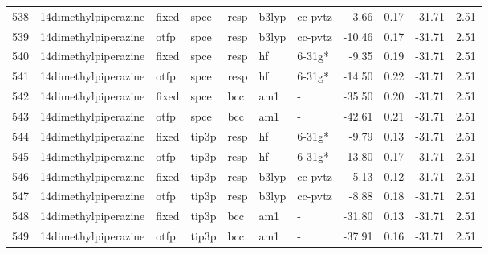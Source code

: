 \begin{tabular}{lllllllrrrr}
538 &          14dimethylpiperazine &  fixed &   spce &   resp &   b3lyp &      cc-pvtz &       -3.66 &     0.17 &      -31.71 &      2.51 \\
539 &          14dimethylpiperazine &   otfp &   spce &   resp &   b3lyp &      cc-pvtz &      -10.46 &     0.17 &      -31.71 &      2.51 \\
540 &          14dimethylpiperazine &  fixed &   spce &   resp &      hf &       6-31g* &       -9.35 &     0.19 &      -31.71 &      2.51 \\
541 &          14dimethylpiperazine &   otfp &   spce &   resp &      hf &       6-31g* &      -14.50 &     0.22 &      -31.71 &      2.51 \\
542 &          14dimethylpiperazine &  fixed &   spce &    bcc &     am1 &            - &      -35.50 &     0.20 &      -31.71 &      2.51 \\
543 &          14dimethylpiperazine &   otfp &   spce &    bcc &     am1 &            - &      -42.61 &     0.21 &      -31.71 &      2.51 \\
544 &          14dimethylpiperazine &  fixed &  tip3p &   resp &      hf &       6-31g* &       -9.79 &     0.13 &      -31.71 &      2.51 \\
545 &          14dimethylpiperazine &   otfp &  tip3p &   resp &      hf &       6-31g* &      -13.80 &     0.17 &      -31.71 &      2.51 \\
546 &          14dimethylpiperazine &  fixed &  tip3p &   resp &   b3lyp &      cc-pvtz &       -5.13 &     0.12 &      -31.71 &      2.51 \\
547 &          14dimethylpiperazine &   otfp &  tip3p &   resp &   b3lyp &      cc-pvtz &       -8.88 &     0.18 &      -31.71 &      2.51 \\
548 &          14dimethylpiperazine &  fixed &  tip3p &    bcc &     am1 &            - &      -31.80 &     0.13 &      -31.71 &      2.51 \\
549 &          14dimethylpiperazine &   otfp &  tip3p &    bcc &     am1 &            - &      -37.91 &     0.16 &      -31.71 &      2.51 \\
\bottomrule
\end{tabular}
